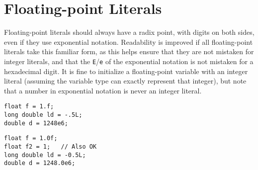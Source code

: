 
\section{Floating-point Literals}\label{sec:floating-point-literals}
Floating-point literals should always have a radix point, with digits on both sides, even if they use exponential notation. Readability is improved if all floating-point literals take this familiar form, as this helps ensure that they are not mistaken for integer literals, and that the \texttt{E}/\texttt{e} of the exponential notation is not mistaken for a hexadecimal digit. It is fine to initialize a floating-point variable with an integer literal (assuming the variable type can exactly represent that integer), but note that a number in exponential notation is never an integer literal.
\begin{verbatim}
float f = 1.f;
long double ld = -.5L;
double d = 1248e6;
\end{verbatim}
\begin{verbatim}
float f = 1.0f;
float f2 = 1;   // Also OK
long double ld = -0.5L;
double d = 1248.0e6;
\end{verbatim}
